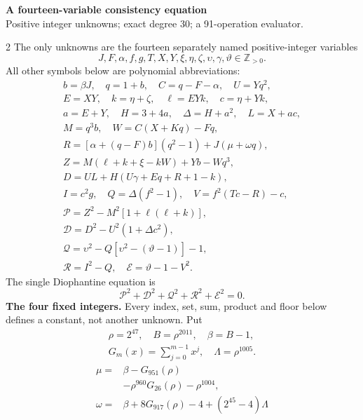 \documentclass[10pt]{article}
\begin{document}
\begin{center}
{\large\bfseries A fourteen-variable consistency equation}\\[-1pt]
{\small Positive integer unknowns; exact degree 30; a 91-operation evaluator.}
\end{center}\vspace{-8pt}
\begin{multicols}{2}
\fontsize{8.6}{9.1}\selectfont
The only unknowns are the fourteen separately named positive-integer variables
\[
J,F,\alpha,f,g,T,X,Y,\xi,\eta,\zeta,\upsilon,\gamma,\vartheta\in\mathbb Z_{>0}.
\]
All other symbols below are polynomial abbreviations:
\[
\begin{gathered}
b=\beta J,\quad q=1+b,\quad C=q-F-\alpha,\quad U=Yq^2,\\
E=XY,\quad k=\eta+\zeta,\quad \ell=EYk,\quad c=\eta+Yk,\\
a=E+Y,\quad H=3+4a,\quad\Delta=H+a^2,\quad L=X+ac,\\
M=q^3b,\quad W=C(X+Kq)-Fq,\\
R=[\alpha+(q-F)b](q^2-1)+J(\mu+\omega q),\\
Z=M(\ell+k+\xi-kW)+Yb-Wq^3,\\
D=UL+H(U\gamma+Eq+R+1-k),\\
I=c^2g,\quad Q=\Delta(f^2-1),\quad V=f^2(Tc-R)-c,\\
\mathcal{P}=Z^2-M^2[1+\ell(\ell+k)],\\
\mathcal{D}=D^2-U^2(1+\Delta c^2),\\
\mathcal{Q}=\upsilon^2-Q[\upsilon^2-(\vartheta-1)]-1,\\
\mathcal{R}=I^2-Q,\quad \mathcal{E}=\vartheta-1-V^2.
\end{gathered}
\]
The single Diophantine equation is
\[
\boxed{\mathcal{P}^2+\mathcal{D}^2+\mathcal{Q}^2+\mathcal{R}^2+\mathcal{E}^2=0.}
\]
\textbf{The four fixed integers.}
Every index, set, sum, product and floor below defines a constant, not
another unknown. Put
\[
\begin{gathered}
\rho=2^{47},\quad B=\rho^{2011},\quad\beta=B-1,\\
G_m(x)=\sum_{j=0}^{m-1}x^j,\quad
\Lambda=\rho^{1005}.
\end{gathered}
\]
\begin{align*}
\mu={}&\beta-G_{951}(\rho)\\
&-\rho^{960}G_{26}(\rho)-\rho^{1004},\\
\omega={}&\beta+8G_{917}(\rho)-4+(2^{45}-4)\Lambda\\

\end{align*}
\end{multicols}
\end{document}
